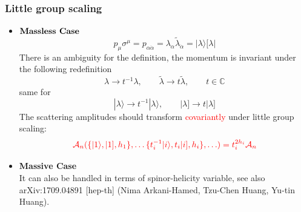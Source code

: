\documentclass{beamer}
\newcommand{\aket}[1]{|#1\rangle}
\newcommand{\sket}[1]{|#1]}
\begin{document}
\begin{frame}
\frametitle{Little group scaling}
    \begin{itemize}
        \item $\textbf{\text{Massless Case}}$\\
    \begin{equation*}
        p_\mu \sigma^\mu=p_{\alpha\dot{\alpha}}=\lambda_\alpha \tilde{\lambda}_{\dot{\alpha}}=\aket{\lambda}[\lambda|
    \end{equation*}
    There is an ambiguity for the definition, the momentum is invariant under the following redefinition
    \begin{equation*}
        \lambda \rightarrow t^{-1}\lambda, \qquad \tilde{\lambda}\rightarrow t\tilde{\lambda}, \qquad t\in\mathbb{C} 
    \end{equation*}
    same for
    \begin{equation*}
        \aket{\lambda}\rightarrow t^{-1}\aket{\lambda}, \qquad \sket{\lambda}\rightarrow t\sket{\lambda}
    \end{equation*}
    The scattering amplitudes should transform \textcolor{red}{covariantly} under little group scaling:
    \begin{equation*}
        \color{red} \mathcal{A}_n(\{\aket{1},\sket{1},h_1\},\ldots\{t_i^{-1}\aket{i},t_i\sket{i},h_i\},\ldots )=t_i^{2h_i}\mathcal{A}_n
    \end{equation*}
    \end{itemize}
\vspace{-2em}
    \begin{itemize}
    \item \textbf{Massive Case}\\
    It can also be handled in terms of spinor-helicity variable, see also 	arXiv:1709.04891 [hep-th] (Nima Arkani-Hamed, Tzu-Chen Huang, Yu-tin Huang).
    \end{itemize}
\end{frame}
\end{document}
